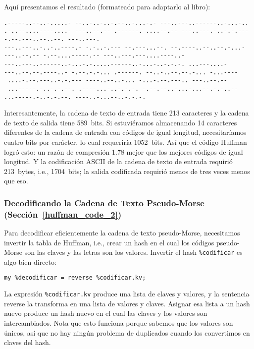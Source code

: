 Aquí presentamos el resultado (formateado para adaptarlo al libro):
\begin{verbatim}
.-----..--..-.....- --..-..-..-.--..-...-.- ---..---..------..-...-..
.-..--....----....- ---..--.-- .------. ....--.-- ---..---.-..-.-.---
-.--.---..--..--. ---..---.
---..---..-..-..----.- -.-..-.--- --.---...--. --.----..--..--.-...- 
---..--.-- -.--....-----.-- ---..---.---....----..-
---..---..------..-...-.-.....------..-...-..-.-.-. ...---....-
---..--.--.----..- -.--.-.-... .------. --..-..--.--.-... -...----
 ....-.--.---..-.-.--- ----..--..-... -...-.--.---.. ---..--.-- 
 ...-----.-..-.-.--. .----...-..-.-.-. -.--.--..-...-...--.-.-..--
...-----.-..-.-.--. ----..-...--..-.-.-.
\end{verbatim}

Interesantemente, la cadena de texto de entrada tiene 213 caracteres
y la cadena de texto de salida tiene 589~bits. Si estuviéramos almacenando
14 caracteres diferentes de la cadena de entrada con códigos de igual 
longitud, necesitaríamos cuatro bits por carácter, lo cual requeriría
1052~bits. Así que el código Huffman logró esto: un razón de compresión 
1.78 mejor que los mejores códigos de igual longitud. Y la codificación 
ASCII de la cadena de texto de entrada requirió 213~bytes, i.e., 1704~bits;
la salida codificada requirió menos de tres veces menos que eso.

\subsubsection{Decodificando la Cadena de Texto Pseudo-Morse (Sección~\ref{huffman_code_2})}

Para decodificar eficientemente la cadena de texto pseudo-Morse,
necesitamos invertir la tabla de Huffman, i.e., crear un hash en 
el cual los códigos pseudo-Morse son las claves y las letras son los
valores. Invertir el hash \verb|%codificar| es algo bien directo:

\begin{verbatim}
my %decodificar = reverse %codificar.kv;
\end{verbatim}

La expresión \verb|%codificar.kv| produce una lista de claves y valores,
y la sentencia reverse la transforma en una lista de valores y claves.
Asignar esa lista a un hash nuevo produce un hash nuevo en el cual 
las claves y los valores son intercambiados. Nota que esto funciona
porque sabemos que los valores son únicos, así que no hay ningún
problema de duplicados cuando los convertimos en claves del hash.

